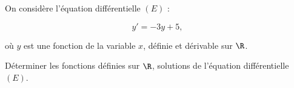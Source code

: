 \medskip

On considère l'équation différentielle $(E)$ :

\[y' = - 3y + 5,\]

où $y$ est une fonction de la variable $x$, définie et dérivable sur $\R$.

Déterminer les fonctions définies sur $\R$, solutions de l'équation différentielle $(E)$.

\bigskip
